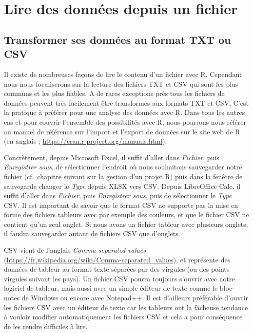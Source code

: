 \documentclass[
]{book}
\begin{document}
\hypertarget{l016read}{%
\section{Lire des données depuis un fichier}\label{l016read}}

\hypertarget{l016transfo}{%
\subsection{Transformer ses données au format TXT ou CSV}\label{l016transfo}}

Il existe de nombreuses façons de lire le contenu d'un fichier avec R. Cependant nous nous focaliserons sur la lecture des fichiers TXT et CSV qui sont les plus communs et les plus fiables. A de rares exceptions près tous les fichiers de données peuvent très facilement être transformés aux formats TXT et CSV. C'est la pratique à préférer pour une analyse des données avec R. Dans tous les autres cas et pour couvrir l'ensemble des possibilités avec R, nous pourrons nous référer au manuel de référence sur l'import et l'export de données sur le site web de R (en anglais ; \url{https://cran.r-project.org/manuals.html}).

Concrètement, depuis Microsoft Excel, il suffit d'aller dans \emph{Fichier}, puis \emph{Enregistrer sous}, de sélectionner l'endroit où nous souhaitons sauvegarder notre fichier (cf.~chapitre suivant sur la gestion d'un projet R) puis dans la fenêtre de sauvegarde changer le \emph{Type} depuis XLSX vers CSV. Depuis LibreOffice Calc, il suffit d'aller dans \emph{Fichier}, puis \emph{Enregistrer sous}, puis de sélectionner le \emph{Type} CSV. Il est important de savoir que le format CSV ne supporte pas la mise en forme des fichiers tableurs avec par exemple des couleurs, et que le fichier CSV ne contient qu'un seul onglet. Si nous avons un fichier tableur avec plusieurs onglets, il faudra sauvegarder autant de fichiers CSV que d'onglets.

CSV vient de l'anglais \emph{Comma-separated values} (\url{https://fr.wikipedia.org/wiki/Comma-separated_values}), et représente des données de tableur au format texte séparées par des virgules (ou des points virgules suivant les pays). Un fichier CSV pourra toujours s'ouvrir avec notre logiciel de tableur, mais aussi avec un simple éditeur de texte comme le bloc-notes de Windows ou encore avec Notepad++. Il est d'ailleurs préférable d'ouvrir les fichiers CSV avec un éditeur de texte car les tableurs ont la fâcheuse tendance à vouloir modifier automatiquement les fichiers CSV et cela a pour conséquence de les rendre difficiles à lire.
\end{document}
